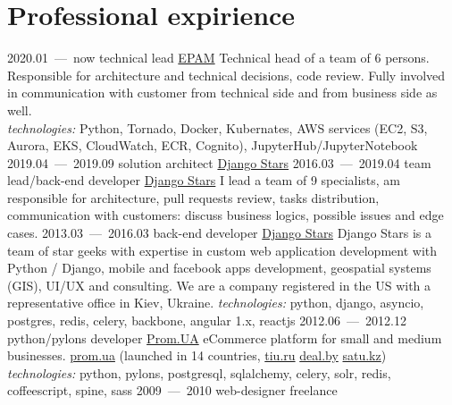 \documentclass[11pt,a4paper,oneside,colorlinks]{moderncv}
\begin{document}
    \section{Professional expirience}
        \cventry
            {2020.01~---~now}
            {technical lead}
            {\href{https://www.epam.com/}{EPAM}}
            {}{}
            {
              Technical head of a team of 6 persons. Responsible for architecture and technical decisions, code review.
              Fully involved in communication with customer from technical side and from business side as well. \\
              \textit{technologies:} Python, Tornado, Docker, Kubernates, AWS services (EC2, S3, Aurora, EKS, CloudWatch, ECR, Cognito), JupyterHub/JupyterNotebook
            }
        \cventry
            {2019.04~---~2019.09}
            {solution architect}
            {\href{http://djangostars.com}{Django Stars}}
            {}{}
            {}
        \cventry
            {2016.03~---~2019.04}
            {team lead/back-end developer}
            {\href{http://djangostars.com}{Django Stars}}
            {}{}
            {
               I lead a team of 9 specialists, am responsible for architecture, pull requests review,
               tasks distribution, communication with customers: discuss business logics, possible issues and edge cases.
            }
        \cventry
            {2013.03~---~2016.03}
            {back-end developer}
            {\href{http://djangostars.com}{Django Stars}}
            {}{}
            {
              Django Stars is a team of star geeks with expertise in custom web application development with Python / Django, mobile and facebook apps development,
              geospatial systems (GIS), UI/UX and consulting. We are a company registered in the US with a representative office in Kiev, Ukraine.\newline{}
              \textit{technologies:} python, django, asyncio, postgres, redis, celery, backbone, angular 1.x, reactjs
            }
        \cventry
            {2012.06~---~2012.12}
            {python/pylons developer}
            {\href{https://prom.ua/}{Prom.UA}}
            {}{}
            {
              eCommerce platform for small and medium businesses. \href{http://prom.ua/}{prom.ua} (launched in 14
              countries, \href{http://tiu.ru/}{tiu.ru} \href{http://deal.by/}{deal.by} \href{http://satu.kz/}{satu.kz})\newline{}
              \textit{technologies:} python, pylons, postgresql, sqlalchemy, celery, solr, redis, coffeescript, spine, sass
            }
        \cventry
            {2009~---~2010}
            {web-designer}
            {freelance}
            {}{}{}
\end{document}
